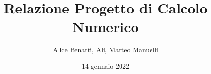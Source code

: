 \documentclass{article}
\title{\textbf{Relazione Progetto di Calcolo Numerico}}
\author{Alice Benatti, Ali, Matteo Manuelli}
\date{14 gennaio 2022}
\begin{document}
\maketitle

\tableofcontents

\newpage
\begin{comment}
Relazione

1. Riportare e commentare i risultati ottenuti nei punti 2. 3. (e 4.) 
su un immagine del set creato e su altre due immagini in bianco e nero 
(fotografiche/mediche/astronomiche)
2. Riportare delle tabelle con le misure di PSNR e MSE ottenute al 
variare dei parametri (dimensione kernel, valore di sigma, la 
deviazione standard del rumore, il parametro di regolarizzazione). 
3. Calcolare sull’intero set di immagini medie e deviazione standard 
delle metriche per alcuni valori fissati dei parametri.  
4. Analizzare su 2 esecuzioni le proprietà dei metodi numerici 
utilizzati (gradiente coniugato e gradiente) in termini di numero di 
iterazioni, andamento dell’errore, della funzione obiettivo, norma del 
gradiente. 
\end{comment}


\end{document}
